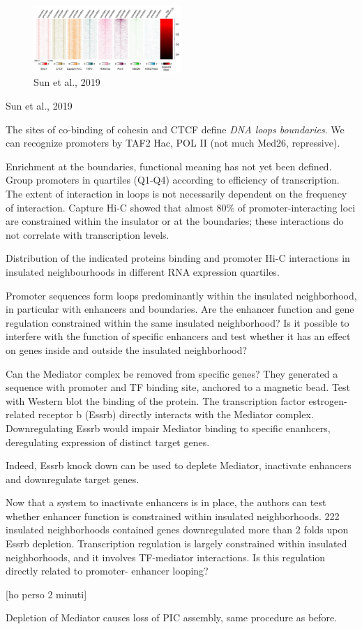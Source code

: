 \begin{figure}
\centering
\includegraphics[width=0.5\textwidth]{../_resources/Screenshot_2022-10-19_at_10-01-09.png}
\caption{Sun et al., 2019}
\end{figure}

Sun et al., 2019

The sites of co-binding of cohesin and CTCF define \emph{DNA loops boundaries}. We can recognize promoters by TAF2 Hac, POL II (not much Med26, repressive).

Enrichment at the boundaries, functional meaning has not yet been defined. Group promoters in quartiles (Q1-Q4) according to efficiency of transcription. The extent of interaction in loops is not necessarily dependent on the frequency of interaction. Capture Hi-C showed that almost 80\% of promoter-interacting loci are constrained within the insulator or at the boundaries; these interactions do not correlate with transcription levels.

Distribution of the indicated proteins binding and promoter Hi-C interactions in insulated neighbourhoods in different RNA expression quartiles.

Promoter sequences form loops predominantly within the insulated neighborhood, in particular with enhancers and boundaries. Are the enhancer function and gene regulation constrained within the same insulated neighborhood? Is it possible to interfere with the function of specific enhancers and test whether it has an effect on genes inside and outside the insulated neighborhood?

Can the Mediator complex be removed from specific genes? They generated a sequence with promoter and TF binding site, anchored to a magnetic bead. Test with Western blot the binding of the protein. The transcription factor estrogen-related receptor b (Essrb) directly interacts with the Mediator complex. Downregulating Essrb would impair Mediator binding to specific enanhcers, deregulating expression of distinct target genes.

Indeed, Essrb knock down can be used to deplete Mediator, inactivate enhancers and downregulate target genes.

Now that a system to inactivate enhancers is in place, the authors can test whether enhancer function is constrained within insulated neighborhoods. 222 insulated neighborhoods contained genes downregulated more than 2 folds upon Essrb depletion. Transcription regulation is largely constrained within insulated neighborhoods, and it involves TF-mediator interactions. Is this regulation directly related to promoter- enhancer looping?

{[}ho perso 2 minuti{]}

Depletion of Mediator causes loss of PIC assembly, same procedure as before.
